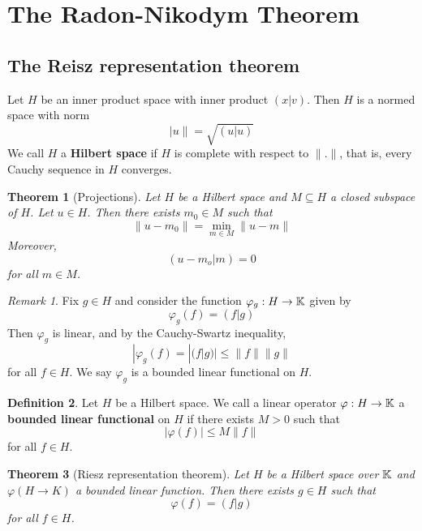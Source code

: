 \documentclass[10pt, oneside, reqno]{amsart}
\theoremstyle{plain}%
\newtheorem{thm}{Theorem}[section]
\theoremstyle{definition}
\newtheorem{defn}[thm]{Definition}
\theoremstyle{remark}
\newtheorem*{rem}{Remark}
\renewcommand{\phi}{\varphi}
\begin{document}

\section{The Radon-Nikodym Theorem} %
\label{sec:the_radon_nikodym_theorem}

\subsection{The Reisz representation theorem} %
\label{sub:the_reisz_representation_theorem}


Let $H$ be an inner product space with inner product $(x|v)$.  Then $H$ is a normed space with norm \[
    |u \| = \sqrt{(u | u)}
\]
We call $H$ a \textbf{Hilbert space} if $H$ is complete with respect to $\| . \|$, that is, every Cauchy sequence in $H$ converges. 


\begin{thm}[Projections]
    Let $H$ be a Hilbert space and $M \subseteq H$ a closed subspace of $H$.  Let $u \in H$.  Then there exists $m_0 \in M$ such that \[
        \| u - m_0 \| = \min_{m \in M} \| u - m \|
    \]
    Moreover, \[
        (u - m_o | m) = 0
    \] for all $m \in M$.
\end{thm}

\begin{rem}
    Fix $g \in H$ and consider the function $\phi_g : H \rightarrow \K$ given by \[
        \phi_g(f) = (f | g)
    \] 
    Then $\phi_g$ is linear, and by the Cauchy-Swartz inequality, \[
        | \phi_g(f) = |(f | g) | \leq \|f \| \|g \|
    \] for all $f \in H$.  We say $\phi_g$ is a bounded linear functional on $H$. 
\end{rem}

\begin{defn}
    Let $H$ be a Hilbert space.  We call a linear operator $\phi: H \rightarrow \K$ a \textbf{bounded linear functional} on $H$ if there exists $M > 0$ such that \[
        | \phi(f) | \leq M \| f \|
    \] for all $f \in H$.
\end{defn}

\begin{thm}[Riesz representation theorem]
    Let $H$ be a Hilbert space over $\mathbb{K}$ and $\phi(H \rightarrow K)$ a bounded linear function.  Then there exists $g \in H$ such that \[
        \phi(f) = (f | g)
    \] for all $f \in H$.
\end{thm}
\end{document}
